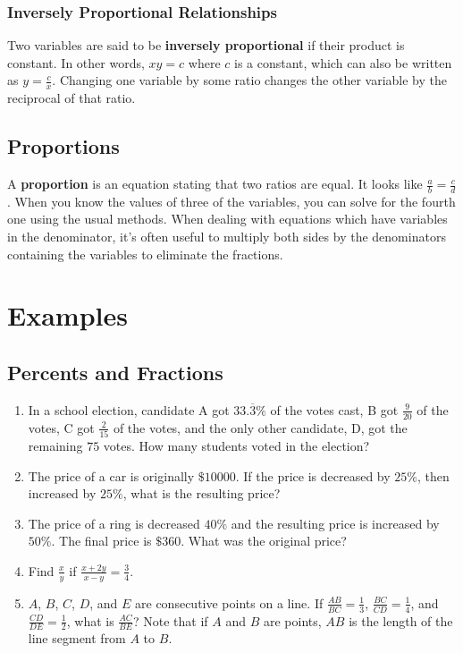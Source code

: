 \documentclass{article}
\begin{document}
    \subsubsection*{Inversely Proportional Relationships}
    Two variables are said to be \textbf{inversely proportional} if their product is constant. In other words, $xy = c$ where $c$ is a constant, which can also be written as $y = \frac{c}{x}$. Changing one variable by some ratio changes the other variable by the reciprocal of that ratio.
    \subsection*{Proportions}
    A \textbf{proportion} is an equation stating that two ratios are equal. It looks like $\frac{a}{b} = \frac{c}{d}$. When you know the values of three of the variables, you can solve for the fourth one using the usual methods. When dealing with equations which have variables in the denominator, it's often useful to multiply both sides by the denominators containing the variables to eliminate the fractions.
    \section*{Examples}
    \subsection*{Percents and Fractions}
    \begin{enumerate}
        \item In a school election, candidate A got $33.\overline{3}\%$ of the votes cast, B got $\frac{9}{20}$ of the votes, C got $\frac{2}{15}$ of the votes, and the only other candidate, D, got the remaining $75$ votes. How many students voted in the election?
        \vspace{3cm}
        \item The price of a car is originally $\$10000$. If the price is decreased by $25\%$, then increased by $25\%$, what is the resulting price?
        \vspace{3cm}
        \item The price of a ring is decreased $40\%$ and the resulting price is increased by $50\%$. The final price is $\$360$. What was the original price?
        \vspace{3cm}
        \item Find $\frac{x}{y}$ if $\frac{x + 2y}{x - y} = \frac{3}{4}$.
        \vspace{3cm}
        \item $A$, $B$, $C$, $D$, and $E$ are consecutive points on a line. If $\frac{AB}{BC} = \frac{1}{3}$, $\frac{BC}{CD} = \frac{1}{4}$, and $\frac{CD}{DE} = \frac{1}{2}$, what is $\frac{AC}{BE}$? Note that if $A$ and $B$ are points, $AB$ is the length of the line segment from $A$ to $B$.
        \vspace{3cm}
    \end{enumerate}
\end{document}
